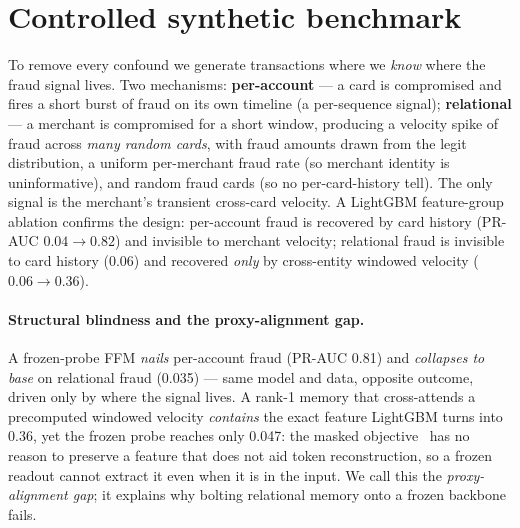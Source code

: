 \section{Controlled synthetic benchmark}
\label{sec:synthetic}

To remove every confound we generate transactions where we \emph{know} where the fraud signal
lives. Two mechanisms: \textbf{per-account} --- a card is compromised and fires a short burst of
fraud on its own timeline (a per-sequence signal); \textbf{relational} --- a merchant is
compromised for a short window, producing a velocity spike of fraud across \emph{many random
cards}, with fraud amounts drawn from the legit distribution, a uniform per-merchant fraud rate
(so merchant identity is uninformative), and random fraud cards (so no per-card-history tell). The
only signal is the merchant's transient cross-card velocity. A LightGBM feature-group ablation
confirms the design: per-account fraud is recovered by card history (PR-AUC $0.04\!\to\!0.82$) and
invisible to merchant velocity; relational fraud is invisible to card history ($0.06$) and
recovered \emph{only} by cross-entity windowed velocity ($0.06\!\to\!0.36$).

\paragraph{Structural blindness and the proxy-alignment gap.} A frozen-probe FFM \emph{nails}
per-account fraud (PR-AUC \num{0.81}) and \emph{collapses to base} on relational fraud
(\num{0.035}) --- same model and data, opposite outcome, driven only by where the signal lives.
A rank-1 memory that cross-attends a precomputed windowed velocity \emph{contains} the exact
feature LightGBM turns into \num{0.36}, yet the frozen probe reaches only \num{0.047}: the masked
objective~\cite{devlin2019bert,he2022mae}
has no reason to preserve a feature that does not aid token reconstruction, so a frozen
readout cannot extract it even when it is in the input. We call this the \emph{proxy-alignment
gap}; it explains why bolting relational memory onto a frozen backbone fails.

